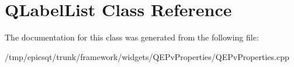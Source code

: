 \hypertarget{classQLabelList}{
\section{QLabelList Class Reference}
\label{classQLabelList}
}


The documentation for this class was generated from the following file:\begin{DoxyCompactItemize}
\item 
/tmp/epicsqt/trunk/framework/widgets/QEPvProperties/QEPvProperties.cpp\end{DoxyCompactItemize}
